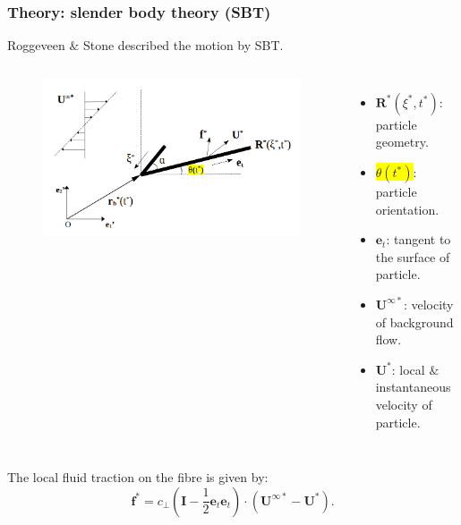 \documentclass{beamer}
\newcommand{\bi}{\begin{itemize}}
\newcommand{\ei}{\end{itemize}}
\begin{document}


\begin{frame}
	\frametitle{Theory: slender body theory (SBT)}
	\begin{overlayarea}{\textwidth}{\textheight}
		\vspace{-0.5cm}\small Roggeveen $\&$ Stone described the motion by SBT. \normalsize
		\begin{columns}
			\begin{figure}[htb]
				\begin{center}
					\includegraphics[width=1\textwidth]{plots/schematic/schematic_rigid_configuration_color2.png}
				\end{center}
			\end{figure}
			\small \bi 
			\item $\mathbf{R}^*(\xi^*,t^*)$: particle geometry.
			\item \colorbox{yellow}{$\theta(t^*)$}: particle orientation.
			\item $\mathbf{e}_t$: tangent to the surface of particle.
			\item $\mathbf{U}^{\infty*}$: velocity of background flow.
			\item $\mathbf{U}^*$: local $\&$ instantaneous velocity of particle.
			\ei
		\end{columns}\vspace{0.5cm}
	The local fluid traction on the fibre is given by: 
		\begin{equation*}
			\mathbf{f}^*=c_\perp\left(\mathbf{I}-\frac{1}{2}\mathbf{e}_t\mathbf{e}_t\right)\cdot(\mathbf{U}^{\infty*}-\mathbf{U}^*).
		\end{equation*}
	\end{overlayarea}
\end{frame}
\end{document}
